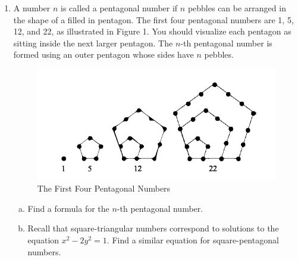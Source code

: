 \documentclass[11pt,letterpaper]{report}
\begin{document}
\begin{enumerate}
	\item A number $n$ is called a pentagonal number if $n$ pebbles can be arranged in the shape of a filled in pentagon. The first four pentagonal numbers are 1, 5, 12, and 22, as illustrated in Figure 1. You should visualize each pentagon as sitting inside the next larger pentagon. The $n$-th pentagonal number is formed using an outer pentagon whose sides have $n$ pebbles.
	\begin{figure}[h]
		\centering
			\includegraphics[scale=.6]{pent.PNG}
			\caption{The First Four Pentagonal Numbers}	
	\end{figure}
	\begin{enumerate}[(a)]
		\item Find a formula for the $n$-th pentagonal number.
		\item Recall that square-triangular numbers correspond to solutions to the equation $x^2-2y^2=1$. Find a similar equation for square-pentagonal numbers.
	\end{enumerate}
\end{enumerate}
\end{document}
